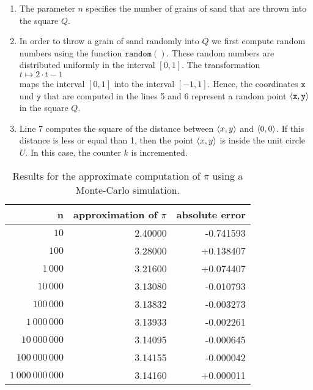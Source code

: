 \begin{enumerate}
\item The parameter $n$ specifies the number of grains of sand that are thrown into the square $Q$.
\item In order to throw a grain of sand randomly into $Q$ we first compute random numbers using the function
      $\mathtt{random}()$.  These random numbers are distributed uniformly in the interval  $[0,1]$.   The
      transformation  
      \\[0.2cm]
      \hspace*{1.3cm}
      $t \mapsto 2 \cdot t - 1$
      \\[0.2cm]
      maps the interval $[0,1]$ into the interval $[-1, 1]$.  Hence, the coordinates $\mathtt{x}$ und
      $\mathtt{y}$ that are computed in the lines 5 and 6 represent a random point $\pair(\mathtt{x}, \mathtt{y})$ 
      in the square $Q$.
\item Line  7 computes the square of the distance between $\pair(x,y)$ and $\pair(0,0)$.  If this distance is
      less or equal than 1, then the point $\pair(x,y)$ is inside the unit circle $U$.  In this case, the counter $k$ is incremented.
\end{enumerate}

\begin{table}[htbp]
  \label{tab:pi}
  \centering
  \begin{tabular}[t]{|r|r|r|}
  \hline
  n & approximation of $\pi$ & absolute error \\
  \hline
  \hline
               $10$ & 2.40000 & -0.741593 \\
\hline
              $100$ & 3.28000 & +0.138407 \\
\hline
           $1\,000$ & 3.21600 & +0.074407 \\
\hline
          $10\,000$ & 3.13080 & -0.010793 \\
\hline
         $100\,000$ & 3.13832 & -0.003273 \\
\hline
      $1\,000\,000$ & 3.13933 & -0.002261 \\
\hline
     $10\,000\,000$ & 3.14095 & -0.000645 \\
\hline
    $100\,000\,000$ & 3.14155 & -0.000042 \\
\hline
 $1\,000\,000\,000$ & 3.14160 & +0.000011 \\
\hline
  \end{tabular}
  \caption{Results for the approximate computation of $\pi$ using a Monte-Carlo simulation.}
\end{table}


